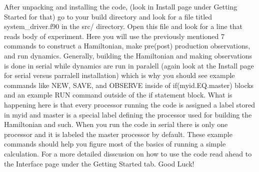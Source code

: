 After unpacking and installing the code, (look in Install page under \textquotesingle{}Getting Started\textquotesingle{} for that) go to your build directory and look for a file titled \textquotesingle{}system\+\_\+driver.\+f90\textquotesingle{} in the src/ directory. Open this file and look for a line that reads \textquotesingle{}body of experiment\textquotesingle{}. Here you will use the previously mentioned 7 commands to construct a Hamiltonian, make pre(post) production observations, and run dynamics. Generally, building the Hamiltonian and making observations is done in serial while dynamics are run in paralell (again look at the Install page for serial versus parralell installation) which is why you should see example commands like \textquotesingle{}N\+EW\textquotesingle{}, \textquotesingle{}S\+A\+VE\textquotesingle{}, and \textquotesingle{}O\+B\+S\+E\+R\+VE\textquotesingle{} inside of if(myid.\+E\+Q.\+master) blocks and an example \textquotesingle{}R\+UN\textquotesingle{} command outside of the if statement block. What is happening here is that every processor running the code is assigned a label stored in \textquotesingle{}myid\textquotesingle{} and \textquotesingle{}master\textquotesingle{} is a special label defining the processor used for building the Hamiltonian and such. When you run the code in serial there is only one processor and it is labeled the master processor by default. These example commands should help you figure most of the basics of running a simple calculation. For a more detailed disscusion on how to use the code read ahead to the Interface page under the \textquotesingle{}Getting Started\textquotesingle{} tab. Good Luck! 
